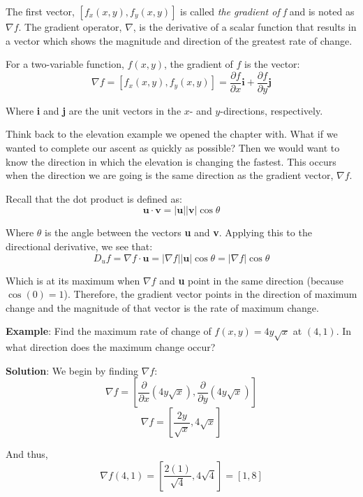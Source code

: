 The first vector, $\left[ f_x(x, y), f_y(x, y) \right]$ is called \textit{the 
gradient of f} and is noted as $\nabla f$. The gradient 
operator, $\nabla$, is the derivative of a scalar function that results in a 
vector which shows the magnitude and direction of the greatest rate of change. 

\begin{mdframed}[style = important, frametitle = {The Gradient}]
For a two-variable function, $f(x, y)$, the gradient of $f$ is the vector:
$$\nabla f = \left[ f_x(x, y), f_y(x, y) \right] = \frac{\partial f}{\partial 
x} \textbf{i} + \frac{\partial f}{\partial y} \textbf{j}$$

Where \textbf{i} and \textbf{j} are the unit vectors in the $x$- and 
$y$-directions, respectively.
\end{mdframed}

Think back to the elevation example we opened the chapter with. What if we 
wanted to complete our ascent as quickly as possible? Then we would want to 
know the direction in which the elevation is changing the fastest. This occurs 
when the direction we are going is the same direction as the gradient vector, 
$\nabla f$. 

Recall that the dot product is defined as:
$$\textbf{u} \cdot \textbf{v} = \left| \textbf{u} \right| \left| \textbf{v} 
\right| \cos{ \theta}$$

Where $\theta$ is the angle between the vectors \textbf{u} and \textbf{v}. 
Applying this to the directional derivative, we see that:
$$D_u f = \nabla f \cdot \textbf{u} = \left| \nabla f \right| \left| 
\textbf{u} \right| \cos{\theta} = \left| \nabla f \right| \cos{\theta}$$

Which is at its maximum when $\nabla f$ and \textbf{u} point in the same 
direction (because $\cos{\left( 0 \right)} = 1$). Therefore, the gradient 
vector points in the direction of maximum change and the magnitude of that 
vector is the rate of maximum change. 

\textbf{Example}: Find the maximum rate of change of $f(x, y) = 4y\sqrt{x}$ at 
$(4, 1)$. In what direction does the maximum change occur?

\textbf{Solution}: We begin by finding $\nabla f$:
$$\nabla f = \left[ \frac{\partial}{\partial x} \left( 4y\sqrt{x} \right), 
\frac{\partial}{\partial y} \left( 4y\sqrt{x} \right) \right]$$
$$\nabla f = \left[ \frac{2y}{\sqrt{x}}, 4\sqrt{x} \right]$$

And thus, 
$$\nabla f(4, 1) = \left[ \frac{2(1)}{\sqrt{4}}, 4\sqrt{4} \right] = \left[ 1, 
8 \right]$$

